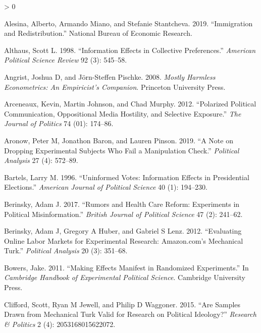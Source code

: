 \documentclass[
  12pt,
]{article}
\newlength{\cslhangindent}
\newenvironment{CSLReferences}[2] %
 {%
  \setlength{\parindent}{0pt}
  \ifodd #1 \everypar{\setlength{\hangindent}{\cslhangindent}}\ignorespaces\fi
  \ifnum #2 > 0
  \setlength{\parskip}{#2\baselineskip}
  \fi
 }%
 {}
\begin{document}
\hypertarget{refs}{}
\begin{CSLReferences}{1}{0}
\leavevmode\hypertarget{ref-alesina2019immigration}{}%
Alesina, Alberto, Armando Miano, and Stefanie Stantcheva. 2019.
{``Immigration and Redistribution.''} National Bureau of Economic
Research.

\leavevmode\hypertarget{ref-althaus1998information}{}%
Althaus, Scott L. 1998. {``Information Effects in Collective
Preferences.''} \emph{American Political Science Review} 92 (3):
545--58.

\leavevmode\hypertarget{ref-angrist2008mostly}{}%
Angrist, Joshua D, and Jörn-Steffen Pischke. 2008. \emph{Mostly Harmless
Econometrics: An Empiricist's Companion}. Princeton University Press.

\leavevmode\hypertarget{ref-arceneaux2012polarized}{}%
Arceneaux, Kevin, Martin Johnson, and Chad Murphy. 2012. {``Polarized
Political Communication, Oppositional Media Hostility, and Selective
Exposure.''} \emph{The Journal of Politics} 74 (01): 174--86.

\leavevmode\hypertarget{ref-aronow2019note}{}%
Aronow, Peter M, Jonathon Baron, and Lauren Pinson. 2019. {``A Note on
Dropping Experimental Subjects Who Fail a Manipulation Check.''}
\emph{Political Analysis} 27 (4): 572--89.

\leavevmode\hypertarget{ref-bartels1996uninformed}{}%
Bartels, Larry M. 1996. {``Uninformed Votes: Information Effects in
Presidential Elections.''} \emph{American Journal of Political Science}
40 (1): 194--230.

\leavevmode\hypertarget{ref-berinsky2017rumors}{}%
Berinsky, Adam J. 2017. {``Rumors and Health Care Reform: Experiments in
Political Misinformation.''} \emph{British Journal of Political Science}
47 (2): 241--62.

\leavevmode\hypertarget{ref-berinsky2012evaluating}{}%
Berinsky, Adam J, Gregory A Huber, and Gabriel S Lenz. 2012.
{``Evaluating Online Labor Markets for Experimental Research:
Amazon.com's Mechanical Turk.''} \emph{Political Analysis} 20 (3):
351--68.

\leavevmode\hypertarget{ref-bowers2011making}{}%
Bowers, Jake. 2011. {``Making Effects Manifest in Randomized
Experiments.''} In \emph{Cambridge Handbook of Experimental Political
Science}. Cambridge University Press.

\leavevmode\hypertarget{ref-clifford2015samples}{}%
Clifford, Scott, Ryan M Jewell, and Philip D Waggoner. 2015. {``Are
Samples Drawn from Mechanical Turk Valid for Research on Political
Ideology?''} \emph{Research \& Politics} 2 (4): 2053168015622072.


\end{CSLReferences}
\end{document}

